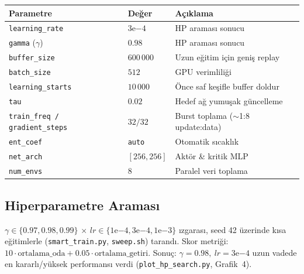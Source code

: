 \documentclass[11pt,a4paper]{article}
\begin{document}
\begin{center}
\begin{tabular}{lll}
\toprule
\textbf{Parametre} & \textbf{Değer} & \textbf{Açıklama} \\
\midrule
\texttt{learning\_rate} & $3\mathrm{e}{-4}$ & HP araması sonucu \\
\texttt{gamma} ($\gamma$) & $0.98$ & HP araması sonucu \\
\texttt{buffer\_size} & $600\,000$ & Uzun eğitim için geniş replay \\
\texttt{batch\_size} & $512$ & GPU verimliliği \\
\texttt{learning\_starts} & $10\,000$ & Önce saf keşifle buffer doldur \\
\texttt{tau} & $0.02$ & Hedef ağ yumuşak güncelleme \\
\texttt{train\_freq / gradient\_steps} & $32 / 32$ & Burst toplama ($\sim$1:8 update:data) \\
\texttt{ent\_coef} & \texttt{auto} & Otomatik sıcaklık \\
\texttt{net\_arch} & $[256, 256]$ & Aktör \& kritik MLP \\
\texttt{num\_envs} & $8$ & Paralel veri toplama \\
\bottomrule
\end{tabular}
\end{center}

\subsection{Hiperparametre Araması}
$\gamma \in \{0.97, 0.98, 0.99\}$ $\times$ $lr \in \{1\mathrm{e}{-4}, 3\mathrm{e}{-4},
1\mathrm{e}{-3}\}$ ızgarası, seed 42 üzerinde kısa eğitimlerle
(\texttt{smart\_train.py}, \texttt{sweep.sh}) tarandı. Skor metriği:
$10\cdot\text{ortalama\_oda} + 0.05\cdot\text{ortalama\_getiri}$. Sonuç:
\textbf{$\gamma=0.98,\ lr=3\mathrm{e}{-4}$} uzun vadede en kararlı/yüksek
performansı verdi (\texttt{plot\_hp\_search.py}, Grafik~4).

\end{document}
